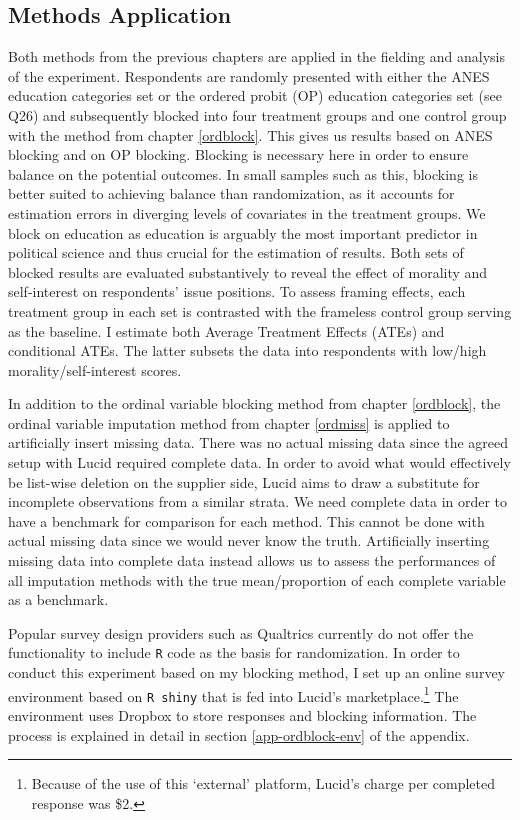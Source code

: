 \documentclass[12pt,econ]{sources/authesis}
\begin{document}
\hypertarget{framing-data-methods}{%
\subsection{Methods Application}\label{framing-data-methods}}

Both methods from the previous chapters are applied in the fielding and analysis of the experiment. Respondents are randomly presented with either the ANES education categories set or the ordered probit (OP) education categories set (see Q26) and subsequently blocked into four treatment groups and one control group with the method from chapter \ref{ordblock}. This gives us results based on ANES blocking and on OP blocking. Blocking is necessary here in order to ensure balance on the potential outcomes. In small samples such as this, blocking is better suited to achieving balance than randomization, as it accounts for estimation errors in diverging levels of covariates in the treatment groups. We block on education as education is arguably the most important predictor in political science and thus crucial for the estimation of results. Both sets of blocked results are evaluated substantively to reveal the effect of morality and self-interest on respondents' issue positions. To assess framing effects, each treatment group in each set is contrasted with the frameless control group serving as the baseline. I estimate both Average Treatment Effects (ATEs) and conditional ATEs. The latter subsets the data into respondents with low/high morality/self-interest scores.

In addition to the ordinal variable blocking method from chapter \ref{ordblock}, the ordinal variable imputation method from chapter \ref{ordmiss} is applied to artificially insert missing data. There was no actual missing data since the agreed setup with Lucid required complete data. In order to avoid what would effectively be list-wise deletion on the supplier side, Lucid aims to draw a substitute for incomplete observations from a similar strata. We need complete data in order to have a benchmark for comparison for each method. This cannot be done with actual missing data since we would never know the truth. Artificially inserting missing data into complete data instead allows us to assess the performances of all imputation methods with the true mean/proportion of each complete variable as a benchmark.

Popular survey design providers such as Qualtrics currently do not offer the functionality to include \texttt{R} code as the basis for randomization. In order to conduct this experiment based on my blocking method, I set up an online survey environment based on \texttt{R\ shiny} that is fed into Lucid's marketplace.\footnote{Because of the use of this `external' platform, Lucid's charge per completed response was \$2.} The environment uses Dropbox to store responses and blocking information. The process is explained in detail in section \ref{app-ordblock-env} of the appendix.
\end{document}
